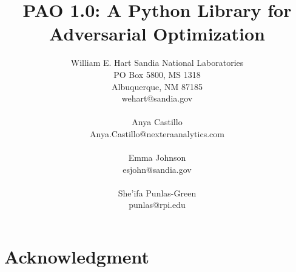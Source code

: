 \documentclass[pdf,12pt,article,relax]{SANDreport}
\title{PAO 1.0: A Python Library for Adversarial Optimization}
\author{William E. Hart
            Sandia National Laboratories\\
           PO Box 5800, MS 1318 \\
           Albuquerque, NM 87185 \\
           wehart@sandia.gov\\
\\
        Anya Castillo\\
            Anya.Castillo@nexteraanalytics.com\\
\\
        Emma Johnson\\
           esjohn@sandia.gov\\
\\
        She'ifa Punlas-Green\\
        punlas@rpi.edu
        }
\date{}
\begin{document}

    \maketitle

    \begin{abstract}
	
    \end{abstract}


    \clearpage
    \section*{Acknowledgment}
	






\end{document}
